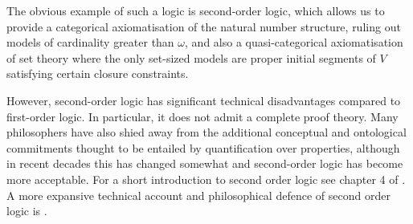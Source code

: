 \documentclass[10pt, a4paper, oneside]{article}
\theoremstyle{definition}
\theoremstyle{remark}
\theoremstyle{plain}
\theoremstyle{plain}
\begin{document}
The obvious example of such a logic is second-order logic, which allows us to
provide a categorical axiomatisation of the natural number structure, ruling out
models of cardinality greater than $\omega$, and also a quasi-categorical
axiomatisation of set theory where the only set-sized models are proper initial
segments of $V$ satisfying certain closure constraints.

However, second-order logic has significant technical disadvantages compared to
first-order logic. In particular, it does not admit a complete proof theory.
Many philosophers have also shied away from the additional conceptual and
ontological commitments thought to be entailed by quantification over
properties, although in recent decades this has changed somewhat and
second-order logic has become more acceptable. For a short introduction to
second order logic see chapter 4 of \citet{vdalen2004}. A more expansive
technical account and philosophical defence of second order logic is
\citet{shapiro2000}.



\end{document}
